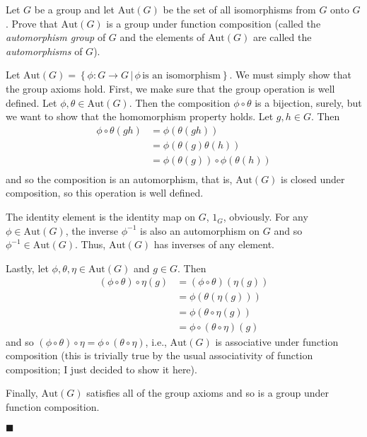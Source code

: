 \documentclass[12pt]{article}
\renewcommand{\qed}{\hfill$\blacksquare$}
\renewenvironment{proof}{\begin{addmargin}[1em]{0em}\begin{newproof}}{\end{newproof}\end{addmargin}\qed}
\newenvironment{problem}[2][Exercise]{\begin{trivlist}
\item[\hskip \labelsep {\bfseries #1}\hskip \labelsep {\bfseries #2.}]}{\end{trivlist}}
\begin{document}
\begin{problem}{1.6.20}
Let $G$ be a group and let $\text{Aut}\left(G\right)$ be the set of all isomorphisms from $G$ onto $G$. Prove that $\text{Aut}\left(G\right)$ is a group under function composition (called the \textit{automorphism group} of $G$ and the elements of $\text{Aut}\left(G\right)$ are called the \textit{automorphisms} of $G$).
\end{problem}
\begin{proof}
Let $\text{Aut}\left(G\right)= \left\{ \phi:G\rightarrow G \, | \, \phi \, \text{is an isomorphism} \right\} $. We must simply show that the group axioms hold. First, we make sure that the group operation is well defined. Let $\phi, \theta \in \text{Aut}\left(G\right)$. Then the composition $\phi \circ \theta$ is a bijection, surely, but we want to show that the homomorphism property holds. Let $g,h\in G$. Then
\begin{equation*}
\begin{split}
    \phi \circ \theta \left(gh\right) & = \phi\left(\theta\left(gh\right)\right) \\
    & = \phi\left(\theta\left(g\right)\theta\left(h\right)\right) \\
    & = \phi\left(\theta\left(g\right)\right) \circ \phi \left(\theta\left(h\right)\right) \\
\end{split}
\end{equation*}
and so the composition is an automorphism, that is, $\text{Aut}\left(G\right)$ is closed under composition, so this operation is well defined.

The identity element is the identity map on $G$, $1_G$, obviously. For any $\phi \in \text{Aut}\left(G\right)$, the inverse $\phi^{-1}$ is also an automorphism on $G$ and so $\phi^{-1}\in \text{Aut}\left(G\right)$. Thus, $\text{Aut}\left(G\right)$ has inverses of any element.

Lastly, let $\phi, \theta, \eta \in \text{Aut}\left(G\right)$ and $g\in G$. Then
\begin{equation*}
    \begin{split}
        \left(\phi \circ \theta\right)\circ \eta \left(g\right) & = \left(\phi \circ \theta\right)\left(\eta\left(g\right)\right) \\
        & = \phi \left(\theta\left(\eta\left(g\right)\right)\right) \\
        & = \phi \left( \theta \circ \eta \left(g\right)\right) \\
        & = \phi \circ \left(\theta \circ \eta \right) \left(g\right)
    \end{split}
\end{equation*}
and so $\left(\phi \circ \theta\right)\circ \eta = \phi \circ \left(\theta \circ \eta\right)$, i.e., $\text{Aut}\left(G\right)$ is associative under function composition (this is trivially true by the usual associativity of function composition; I just decided to show it here).

Finally, $\text{Aut}\left(G\right)$ satisfies all of the group axioms and so is a group under function composition.
\end{proof}
\end{document}
